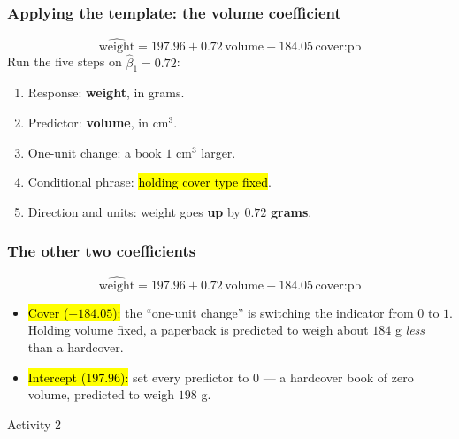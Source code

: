 \documentclass[slidestop,compress,mathserif]{beamer}
\begin{document}
\begin{frame}
\frametitle{Applying the template: the volume coefficient}
\[ \widehat{\text{weight}} = 197.96 + 0.72\,\text{volume} - 184.05\,\text{cover:pb} \]
Run the five steps on $\widehat{\beta}_1=0.72$:

\vspace{-0.3em}
{\footnotesize
\begin{enumerate}
\item Response: \textbf{weight}, in grams.
\pause
\item Predictor: \textbf{volume}, in cm$^3$.
\pause
\item One-unit change: a book $1$ cm$^3$ larger.
\pause
\item Conditional phrase: \hl{holding cover type fixed}.
\pause
\item Direction and units: weight goes \textbf{up} by $0.72$ \textbf{grams}.
\end{enumerate}}

\pause
\vspace{-0.4em}

\end{frame}
\begin{frame}
\frametitle{The other two coefficients}
\[ \widehat{\text{weight}} = 197.96 + 0.72\,\text{volume} - 184.05\,\text{cover:pb} \]
\begin{itemize}
\item \hl{Cover ($-184.05$):} the ``one-unit change'' is switching the indicator from $0$ to $1$. Holding volume fixed, a paperback is predicted to weigh about $184$ g \emph{less} than a hardcover.
\pause
\item \hl{Intercept ($197.96$):} set every predictor to $0$ --- a hardcover book of zero volume, predicted to weigh $198$ g.
\end{itemize}

\pause
{}

\end{frame}
\begin{frame}{Activity 2}
\end{frame}
\end{document}
